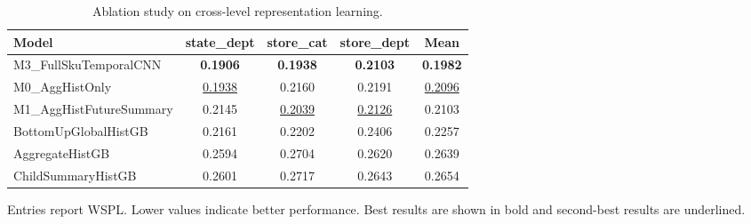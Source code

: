 \begin{table}[H]
\centering
\caption{Ablation study on cross-level representation learning.}
\label{tab:ablation}
\begin{threeparttable}
\begin{tabular}{lcccc}
\toprule
Model & state\_dept & store\_cat & store\_dept & Mean \\
\midrule
M3\_FullSkuTemporalCNN & \textbf{0.1906} & \textbf{0.1938} & \textbf{0.2103} & \textbf{0.1982} \\
M0\_AggHistOnly & \underline{0.1938} & 0.2160 & 0.2191 & \underline{0.2096} \\
M1\_AggHistFutureSummary & 0.2145 & \underline{0.2039} & \underline{0.2126} & 0.2103 \\
BottomUpGlobalHistGB & 0.2161 & 0.2202 & 0.2406 & 0.2257 \\
AggregateHistGB & 0.2594 & 0.2704 & 0.2620 & 0.2639 \\
ChildSummaryHistGB & 0.2601 & 0.2717 & 0.2643 & 0.2654 \\
\bottomrule
\end{tabular}
\begin{tablenotes}
\footnotesize \item Entries report WSPL. Lower values indicate better performance. Best results are shown in bold and second-best results are underlined.
\end{tablenotes}
\end{threeparttable}
\end{table}
